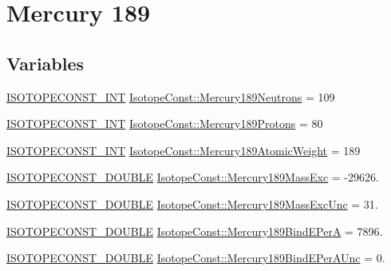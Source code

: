 \hypertarget{group___isotope_const-_mercury-_hg189}{}\section{Mercury 189}
\label{group___isotope_const-_mercury-_hg189}
\subsection*{Variables}
\begin{DoxyCompactItemize}
\item 
\mbox{\hyperlink{group___isotope_const-_macros_ga5f18360b3e99483a35c32d789e62621c}{I\+S\+O\+T\+O\+P\+E\+C\+O\+N\+S\+T\+\_\+\+I\+NT}} \mbox{\hyperlink{group___isotope_const-_mercury-_hg189_gad30c3e6005cdd30a6ee342e3367905ae}{Isotope\+Const\+::\+Mercury189\+Neutrons}} = 109
\item 
\mbox{\hyperlink{group___isotope_const-_macros_ga5f18360b3e99483a35c32d789e62621c}{I\+S\+O\+T\+O\+P\+E\+C\+O\+N\+S\+T\+\_\+\+I\+NT}} \mbox{\hyperlink{group___isotope_const-_mercury-_hg189_ga3cd0b5d7d0e6031ff024766450311b26}{Isotope\+Const\+::\+Mercury189\+Protons}} = 80
\item 
\mbox{\hyperlink{group___isotope_const-_macros_ga5f18360b3e99483a35c32d789e62621c}{I\+S\+O\+T\+O\+P\+E\+C\+O\+N\+S\+T\+\_\+\+I\+NT}} \mbox{\hyperlink{group___isotope_const-_mercury-_hg189_ga20d96a49716131b8970b28be4552f17a}{Isotope\+Const\+::\+Mercury189\+Atomic\+Weight}} = 189
\item 
\mbox{\hyperlink{group___isotope_const-_macros_ga8f45a7272ce02c0b4c65c44636ed719a}{I\+S\+O\+T\+O\+P\+E\+C\+O\+N\+S\+T\+\_\+\+D\+O\+U\+B\+LE}} \mbox{\hyperlink{group___isotope_const-_mercury-_hg189_ga023c49ecb92d35f83531bde2c51eebc7}{Isotope\+Const\+::\+Mercury189\+Mass\+Exc}} = -\/29626.
\item 
\mbox{\hyperlink{group___isotope_const-_macros_ga8f45a7272ce02c0b4c65c44636ed719a}{I\+S\+O\+T\+O\+P\+E\+C\+O\+N\+S\+T\+\_\+\+D\+O\+U\+B\+LE}} \mbox{\hyperlink{group___isotope_const-_mercury-_hg189_ga37f12978eaaaece34e19a11bb544cd95}{Isotope\+Const\+::\+Mercury189\+Mass\+Exc\+Unc}} = 31.
\item 
\mbox{\hyperlink{group___isotope_const-_macros_ga8f45a7272ce02c0b4c65c44636ed719a}{I\+S\+O\+T\+O\+P\+E\+C\+O\+N\+S\+T\+\_\+\+D\+O\+U\+B\+LE}} \mbox{\hyperlink{group___isotope_const-_mercury-_hg189_ga50ef141c9a3d0a48232e2dacb9fd3bf9}{Isotope\+Const\+::\+Mercury189\+Bind\+E\+PerA}} = 7896.
\item 
\mbox{\hyperlink{group___isotope_const-_macros_ga8f45a7272ce02c0b4c65c44636ed719a}{I\+S\+O\+T\+O\+P\+E\+C\+O\+N\+S\+T\+\_\+\+D\+O\+U\+B\+LE}} \mbox{\hyperlink{group___isotope_const-_mercury-_hg189_gaccac87871380fd4d49477e5f6b1f06fd}{Isotope\+Const\+::\+Mercury189\+Bind\+E\+Per\+A\+Unc}} = 0.

\end{DoxyCompactItemize}
